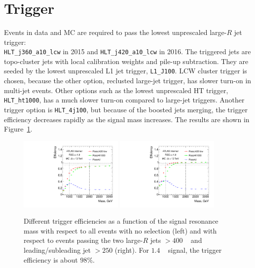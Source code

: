 \section{Trigger}
\label{evt-sel:trig}
\paragraph{}
Events in data and MC are required to pass the lowest unprescaled large-$R$ jet trigger: \\
\verb|HLT_j360_a10_lcw| in 2015 and \verb|HLT_j420_a10_lcw| in 2016. 
The triggered jets are topo-cluster jets with local calibration weights and pile-up subtraction.
They are seeded by the lowest unprescaled L1 jet trigger, \texttt{L1\_J100}. 
LCW cluster trigger is chosen, because the other option, reclusted large-\R jet trigger, has slower turn-on in multi-jet events. 
Other options such as the lowest unprescaled HT trigger, \verb|HLT_ht1000|, has a much slower turn-on compared to large-\R jet triggers.
Another trigger option is \verb|HLT_4j100|, but because of the boosted jets merging, the trigger efficiency decreases rapidly as the signal mass increases. 
The results are shown in Figure~\ref{fig:boosted-trigger-HLT}.

\begin{figure}[htbp!]
\begin{center}
  \includegraphics[width=0.45\textwidth,angle=-90]{figures/boosted/Trigger/app_trig_b77_Efficiency_PreSel.pdf}
  \includegraphics[width=0.45\textwidth,angle=-90]{figures/boosted/Trigger/app_trig_b77_Efficiency_All.pdf}
  \caption{Different trigger efficiencies as a function of the signal resonance mass with respect to all events with no selection (left) and with respect to events passing the two large-$R$ jets \pt $> 400$ \GeV~ and leading/subleading jet \pt $> 250$ \GeV (right). For $1.4$ \TeV~ signal, the trigger efficiency is about $98\%$.}
  \label{fig:boosted-trigger-HLT}
\end{center}
\end{figure}

